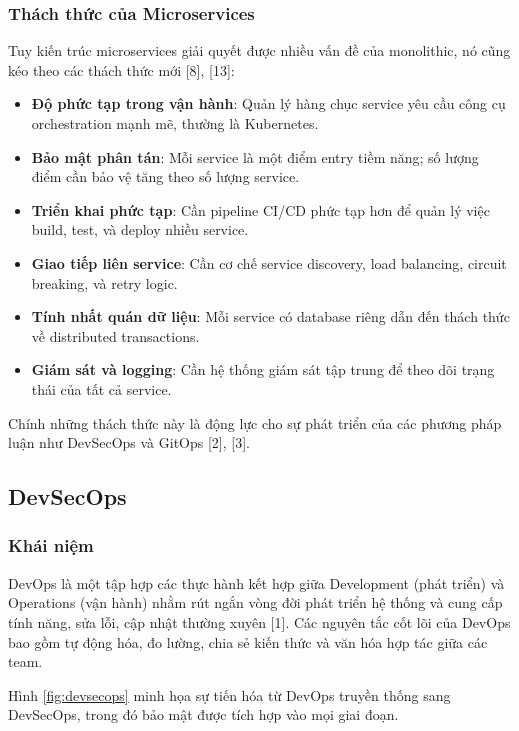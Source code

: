 \documentclass[13pt,a4paper,twoside]{extarticle}
\begin{document}
\subsubsection{Thách thức của Microservices}

Tuy kiến trúc microservices giải quyết được nhiều vấn đề của monolithic, nó cũng kéo theo các thách thức mới [8], [13]:

\begin{itemize}[leftmargin=*,nosep]
  \item \textbf{Độ phức tạp trong vận hành}: Quản lý hàng chục service yêu cầu công cụ orchestration mạnh mẽ, thường là Kubernetes.
  \item \textbf{Bảo mật phân tán}: Mỗi service là một điểm entry tiềm năng; số lượng điểm cần bảo vệ tăng theo số lượng service.
  \item \textbf{Triển khai phức tạp}: Cần pipeline CI/CD phức tạp hơn để quản lý việc build, test, và deploy nhiều service.
  \item \textbf{Giao tiếp liên service}: Cần cơ chế service discovery, load balancing, circuit breaking, và retry logic.
  \item \textbf{Tính nhất quán dữ liệu}: Mỗi service có database riêng dẫn đến thách thức về distributed transactions.
  \item \textbf{Giám sát và logging}: Cần hệ thống giám sát tập trung để theo dõi trạng thái của tất cả service.
\end{itemize}

Chính những thách thức này là động lực cho sự phát triển của các phương pháp luận như DevSecOps và GitOps [2], [3].

\subsection{DevSecOps}

\subsubsection{Khái niệm}

DevOps là một tập hợp các thực hành kết hợp giữa Development (phát triển) và Operations (vận hành) nhằm rút ngắn vòng đời phát triển hệ thống và cung cấp tính năng, sửa lỗi, cập nhật thường xuyên [1]. Các nguyên tắc cốt lõi của DevOps bao gồm tự động hóa, đo lường, chia sẻ kiến thức và văn hóa hợp tác giữa các team.

Hình \ref{fig:devsecops} minh họa sự tiến hóa từ DevOps truyền thống sang DevSecOps, trong đó bảo mật được tích hợp vào mọi giai đoạn.
\end{document}
